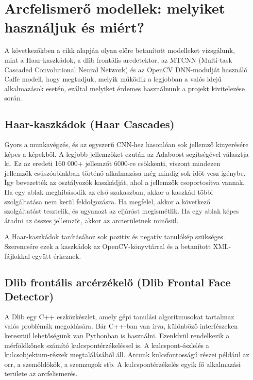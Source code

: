 \newpage

\section{Arcfelismerő modellek: melyiket használjuk és miért?}

A következőkben a \cite{21} cikk alapján olyan előre betanított modelleket vizsgálunk, mint a Haar-kaszkádok, a dlib frontális arcdetektor, az MTCNN (Multi-task Cascaded Convolutional Neural Network) és az OpenCV DNN-modulját használó Caffe modell, hogy megtudjuk, melyik működik a legjobban a valós idejű alkalmazások esetén, ezáltal melyiket érdemes használnunk a projekt kivitelezése során.

\subsection{Haar-kaszkádok (Haar Cascades)}

Gyors a munkavégzés, és az egyszerű CNN-hez hasonlóan sok jellemző kinyerésére képes a képekből. A legjobb jellemzőket ezután az Adaboost segítségével választja ki. Ez az eredeti 160 000+ jellemzőt 6000-re csökkenti, viszont mindezen jellemzők csúszóablakban történő alkalmazása még mindig sok időt vesz igénybe. Így bevezették az osztályozók kaszkádját, ahol a jellemzők csoportosítva vannak. Ha egy ablak meghibásodik az első szakaszban, akkor a kaszkád többi szolgáltatása nem kerül feldolgozásra. Ha megfelel, akkor a következő szolgáltatást tesztelik, és ugyanazt az eljárást megismétlik. Ha egy ablak képes átadni az összes jellemzőt, akkor az arcterületnek minősül.


A Haar-kaszkádok tanításához sok pozitív és negatív tanulókép szükséges. Szerencsére ezek a kaszkádok az OpenCV-könyvtárral és a betanított XML-fájlokkal együtt érkeznek.


\subsection{Dlib frontális arcérzékelő (Dlib Frontal Face Detector)}

A Dlib egy C++ eszközkészlet, amely gépi tanulási algoritmusokat tartalmaz valós problémák megoldására. Bár C++-ban van írva, különböző interfészeken keresztül lehetőségünk van Pythonban is használni. Ezenkívül rendelkezik a mérföldkőnek számító kulcspontérzékeléssel is.
A kulcspont-észlelés a kulcsobjektum-részek megtalálásából áll. Arcunk kulcsfontosságú részei például az orr, a szemöldökök, a szemzugok stb. A kulcspontérzékelés egyik fő alkalmazási területe az arcfelismerés.

